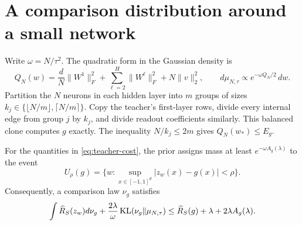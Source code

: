 \section{A comparison distribution around a small network}
\label{sec:teacher}
Write $\omega=N/\tau^2$.  The quadratic form in the Gaussian density is
\[
 Q_N(w)=\frac dN\|W^1\|_F^2+\sum_{\ell=2}^H\|W^\ell\|_F^2+N\|v\|_2^2,
 \qquad d\mu_{N,\tau}\propto e^{-\omega Q_N/2}\,dw.
\]
Partition the $N$ neurons in each hidden layer into $m$ groups of sizes $k_j\in\{\lfloor N/m\rfloor,\lceil N/m\rceil\}$. Copy the teacher's first-layer rows, divide every internal edge from group $j$ by $k_j$, and divide readout coefficients similarly. This balanced clone computes $g$ exactly. The inequality $N/k_j\le2m$ gives $Q_N(w_*)\le E_g$.

\begin{lemma}
\label{lem:teacher}
For the quantities in \eqref{eq:teacher-cost}, the prior assigns mass at least $e^{-\omega A_g(\lambda)}$ to the event
\[
 U_\rho(g)=\{w:\sup_{x\in[-1,1]^d}|z_w(x)-g(x)|<\rho\}.
\]
Consequently, a comparison law $\nu_g$ satisfies
\begin{equation}
 \int\widehat R_S(z_w)d\nu_g+\frac{2\lambda}{\omega}\operatorname{KL}(\nu_g\Vert\mu_{N,\tau})
 \le\widehat R_S(g)+\lambda+2\lambda A_g(\lambda).
 \label{eq:comparison}
\end{equation}
\end{lemma}
